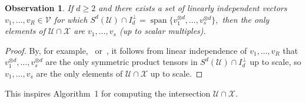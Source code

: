 \documentclass[11pt]{article}
\newtheorem{obs}[theorem]{Observation}
\theoremstyle{definition}
\newcommand{\field}{\mathbb{F}}
\newcommand\X{\mathcal{X}}
\newcommand\V{\mathcal{V}}
\newcommand\U{\mathcal{U}}
\DeclareMathOperator{\spn}{span}
\def\ba#1\ea{\begin{align}#1\end{align}}
\begin{document}
\begin{obs}\label{obs:find}
If $d \geq 2$ and there exists a set of linearly independent vectors $v_1,\dots, v_R \in \V$ for which $S^d(\U) \cap I_d^{\perp}=\spn\{v_1^{\otimes d},\dots, v_s^{\otimes d}\},$ then the only elements of $\U \cap \X$ are $v_1,\dots, v_s$ (up to scalar multiples).
\end{obs}
\begin{proof}
By, for example,~\cite[Theorem 3.2]{1751-8121-48-4-045303} or~\cite[Corollary 19]{tensor}, it follows from linear independence of $v_1,\dots, v_R$ that $v_1^{\otimes d}, \dots, v_s^{\otimes d}$ are the only symmetric product tensors in $S^d(\U) \cap I_d^{\perp}$ up to scale, so $v_1,\dots, v_s$ are the only elements of $\U \cap \X$ up to scale.
\end{proof}

This inspires Algorithm~1 for computing the intersection $\U\cap \X$.
\end{document}
